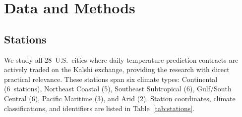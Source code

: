 \documentclass[12pt, letterpaper]{article}
\begin{document}
\section{Data and Methods}
\label{sec:methods}

\subsection{Stations}
\label{sec:stations}

We study all 28~U.S.\ cities where daily temperature prediction contracts are
actively traded on the Kalshi exchange, providing the research with direct practical
relevance. These stations span six climate types: Continental (6~stations),
Northeast Coastal (5), Southeast Subtropical (6), Gulf/South Central (6), Pacific
Maritime (3), and Arid (2). Station coordinates, climate classifications, and
identifiers are listed in Table~\ref{tab:stations}.
\end{document}
